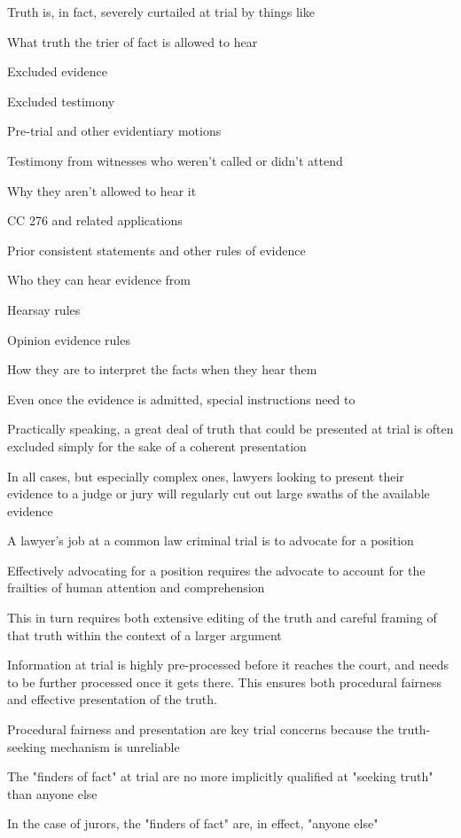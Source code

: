 Truth is, in fact, severely curtailed at trial by things like

What truth the trier of fact is allowed to hear

Excluded evidence

Excluded testimony

Pre-trial and other evidentiary motions

Testimony from witnesses who weren't called or didn't attend

Why they aren't allowed to hear it

CC 276 and related applications

Prior consistent statements and other rules of evidence

Who they can hear evidence from

Hearsay rules

Opinion evidence rules

How they are to interpret the facts when they hear them

Even once the evidence is admitted, special instructions need to

Practically speaking, a great deal of truth that could be presented at trial is often excluded simply for the sake of a coherent presentation

In all cases, but especially complex ones, lawyers looking to present their evidence to a judge or jury will regularly cut out large swaths of the available evidence

A lawyer's job at a common law criminal trial is to advocate for a position

Effectively advocating for a position requires the advocate to account for the frailties of human attention and comprehension

This in turn requires both extensive editing of the truth and careful framing of that truth within the context of a larger argument

Information at trial is highly pre-processed before it reaches the court, and needs to be further processed once it gets there. This ensures both procedural fairness and effective presentation of the truth.

Procedural fairness and presentation are key trial concerns because the truth-seeking mechanism is unreliable

The "finders of fact" at trial are no more implicitly qualified at "seeking truth" than anyone else

In the case of jurors, the "finders of fact" are, in effect, "anyone else"

